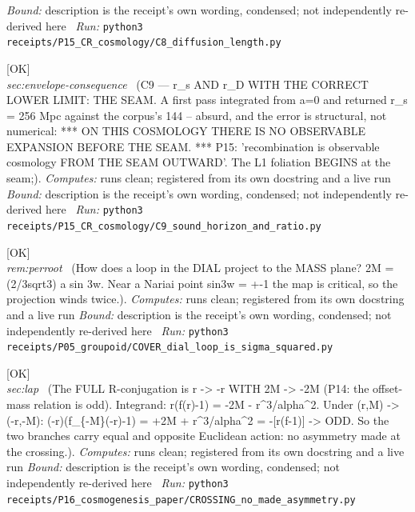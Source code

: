 \begin{description}
 \emph{Bound:} description is the receipt's own wording, condensed; not independently re-derived here
\ \emph{Run:} \texttt{python3 receipts/P15\_CR\_cosmology/C8\_diffusion\_length.py}
\item[\label{rcpt:C9_sound_horizon_and_ratio}\texttt{C9\_sound\_horizon\_and\_ratio}]\hfill\textsf{[OK]}\\
\textit{sec:envelope-consequence} \ (C9 --- r\_s AND r\_D WITH THE CORRECT LOWER LIMIT: THE SEAM. A first pass integrated from a=0 and returned r\_s = 256 Mpc against the corpus's 144 -- absurd, and the error is structural, not numerical: *** ON THIS COSMOLOGY THERE IS NO OBSERVABLE EXPANSION BEFORE THE SEAM. *** P15: 'recombination is observable cosmology FROM THE SEAM OUTWARD'. The L1 foliation BEGINS at the seam;). 
\emph{Computes:} runs clean; registered from its own docstring and a live run
 \emph{Bound:} description is the receipt's own wording, condensed; not independently re-derived here
\ \emph{Run:} \texttt{python3 receipts/P15\_CR\_cosmology/C9\_sound\_horizon\_and\_ratio.py}
\item[\label{rcpt:COVER_dial_loop_is_sigma_squared}\texttt{COVER\_dial\_loop\_is\_sigma\_squared}]\hfill\textsf{[OK]}\\
\textit{rem:perroot} \ (How does a loop in the DIAL project to the MASS plane? 2M = (2/3sqrt3) a sin 3w. Near a Nariai point sin3w = +-1 the map is critical, so the projection winds twice.). 
\emph{Computes:} runs clean; registered from its own docstring and a live run
 \emph{Bound:} description is the receipt's own wording, condensed; not independently re-derived here
\ \emph{Run:} \texttt{python3 receipts/P05\_groupoid/COVER\_dial\_loop\_is\_sigma\_squared.py}
\item[\label{rcpt:CROSSING_no_made_asymmetry}\texttt{CROSSING\_no\_made\_asymmetry}]\hfill\textsf{[OK]}\\
\textit{sec:lap} \ (The FULL R-conjugation is r -> -r WITH 2M -> -2M (P14: the offset-mass relation is odd). Integrand: r(f(r)-1) = -2M - r\textasciicircum{}3/alpha\textasciicircum{}2. Under (r,M) -> (-r,-M): (-r)(f\_\{-M\}(-r)-1) = +2M + r\textasciicircum{}3/alpha\textasciicircum{}2 = -[r(f-1)] -> ODD. So the two branches carry equal and opposite Euclidean action: no asymmetry made at the crossing.). 
\emph{Computes:} runs clean; registered from its own docstring and a live run
 \emph{Bound:} description is the receipt's own wording, condensed; not independently re-derived here
\ \emph{Run:} \texttt{python3 receipts/P16\_cosmogenesis\_paper/CROSSING\_no\_made\_asymmetry.py}

\end{description}
